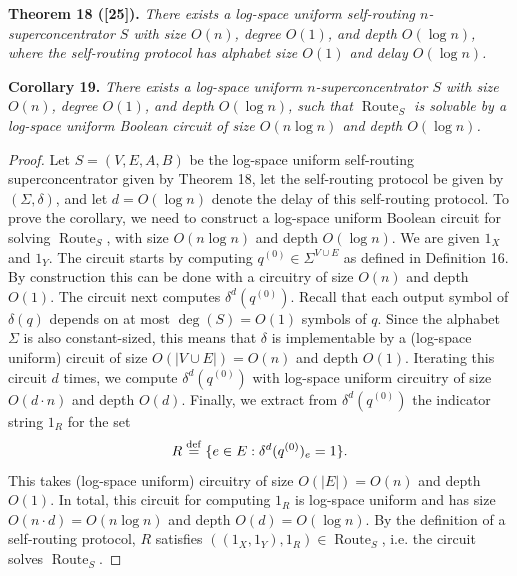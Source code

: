 \documentclass[10pt,a4paper]{article}
\newenvironment{originalresult}[1]{\par\medskip\noindent\textbf{#1.}\itshape}{\par\medskip}
\begin{document}
\begin{originalresult}{Theorem 18 ([25])}
There exists a log-space uniform self-routing $n$-superconcentrator $S$ with size $O(n)$, degree $O(1)$, and depth $O(\log n)$, where the self-routing protocol has alphabet size $O(1)$ and delay $O(\log n)$.
\end{originalresult}
\begin{originalresult}{Corollary 19}
There exists a log-space uniform $n$-superconcentrator $S$ with size $O(n)$, degree $O(1)$, and depth $O(\log n)$, such that $\operatorname{Route}_S$ is solvable by a log-space uniform Boolean circuit of size $O(n\log n)$ and depth $O(\log n)$.
\end{originalresult}
\begin{proof}
Let $S=(V,E,A,B)$ be the log-space uniform self-routing superconcentrator given by Theorem 18, let the self-routing protocol be given by $(\Sigma,\delta)$, and let $d=O(\log n)$ denote the delay of this self-routing protocol. To prove the corollary, we need to construct a log-space uniform Boolean circuit for solving $\operatorname{Route}_S$, with size $O(n\log n)$ and depth $O(\log n)$.
We are given $1_X$ and $1_Y$. The circuit starts by computing $q^{(0)}\in\Sigma^{V\cup E}$ as defined in Definition 16. By construction this can be done with a circuitry of size $O(n)$ and depth $O(1)$. The circuit next computes $\delta^d(q^{(0)})$. Recall that each output symbol of $\delta(q)$ depends on at most $\deg(S)=O(1)$ symbols of $q$. Since the alphabet $\Sigma$ is also constant-sized, this means that $\delta$ is implementable by a (log-space uniform) circuit of size $O(|V\cup E|)=O(n)$ and depth $O(1)$. Iterating this circuit $d$ times, we compute $\delta^d(q^{(0)})$ with log-space uniform circuitry of size $O(d\cdot n)$ and depth $O(d)$. Finally, we extract from $\delta^d(q^{(0)})$ the indicator string $1_R$ for the set
\[R\stackrel{\rm def}=\{e\in E:\delta^d(q^{(0)})_e=1\}.\]
This takes (log-space uniform) circuitry of size $O(|E|)=O(n)$ and depth $O(1)$.
In total, this circuit for computing $1_R$ is log-space uniform and has size $O(n\cdot d)=O(n\log n)$ and depth $O(d)=O(\log n)$. By the definition of a self-routing protocol, $R$ satisfies $((1_X,1_Y),1_R)\in\operatorname{Route}_S$, i.e. the circuit solves $\operatorname{Route}_S$.
\end{proof}
\end{document}
